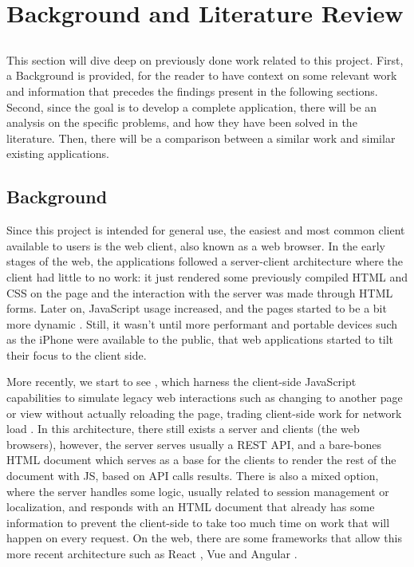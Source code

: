 \chapter{Background and Literature Review} \label{chap:sota}

\section*{}

This section will dive deep on previously done work related to this project. First, a Background is provided, for the reader to have context on some relevant work and information that precedes the findings present in the following sections. Second, since the goal is to develop a complete application, there will be an analysis on the specific problems, and how they have been solved in the literature. Then, there will be a comparison between a similar work and similar existing applications.

\section*{Background}

Since this project is intended for general use, the easiest and most common client available to users is the web client, also known as a web browser. In the early stages of the web, the applications followed a server-client architecture where the client had little to no work: it just rendered some previously compiled HTML and CSS on the page and the interaction with the server was made through HTML forms. Later on, JavaScript usage increased, and the pages started to be a bit more dynamic \cite{ShklarRosen09}. Still, it wasn't until more performant and portable devices such as the iPhone were available to the public, that web applications started to tilt their focus to the client side. 

More recently, we start to see , which harness the client-side JavaScript capabilities to simulate legacy web interactions such as changing to another page or view without actually reloading the page, trading client-side work for network load \cite{Lugo-Cordero2015} \cite{Derezinska2020} \cite{Mesbah2007} \cite{Mesbah2007a}. In this architecture, there still exists a server and clients (the web browsers), however, the server serves usually a REST API, and a bare-bones HTML document which serves as a base for the clients to render the rest of the document with JS, based on API calls results. There is also a mixed option, where the server handles some logic, usually related to session management or localization, and responds with an HTML document that already has some information to prevent the client-side to take too much time on work that will happen on every request. On the web, there are some frameworks that allow this more recent architecture such as React \cite{React}, Vue \cite{Vue} and Angular \cite{Angular}.

